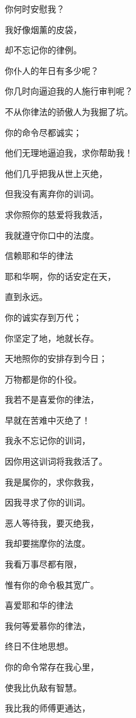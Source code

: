 {\par }{\Q 你何时安慰我？
\par }{\Q {}我好像烟薰的皮袋，
\par }{\Q 却不忘记你的律例。
\par }{\Q {}你仆人的年日有多少呢？
\par }{\Q 你几时向逼迫我的人施行审判呢？
\par }{\Q {}不从你律法的骄傲人为我掘了坑。
\par }{\Q {}你的命令尽都诚实；
\par }{\Q 他们无理地逼迫我，求你帮助我！
\par }{\Q {}他们几乎把我从世上灭绝，
\par }{\Q 但我没有离弃你的训词。
\par }{\Q {}求你照你的慈爱将我救活，
\par }{\Q 我就遵守你口中的法度。
\par }{\SH 信赖耶和华的律法
\par }{\Q {}耶和华啊，你的话安定在天，
\par }{\Q 直到永远。
\par }{\Q {}你的诚实存到万代；
\par }{\Q 你坚定了地，地就长存。
\par }{\Q {}天地照你的安排存到今日；
\par }{\Q 万物都是你的仆役。
\par }{\Q {}我若不是喜爱你的律法，
\par }{\Q 早就在苦难中灭绝了！
\par }{\Q {}我永不忘记你的训词，
\par }{\Q 因你用这训词将我救活了。
\par }{\Q {}我是属你的，求你救我，
\par }{\Q 因我寻求了你的训词。
\par }{\Q {}恶人等待我，要灭绝我，
\par }{\Q 我却要揣摩你的法度。
\par }{\Q {}我看万事尽都有限，
\par }{\Q 惟有你的命令极其宽广。
\par }{\SH 喜爱耶和华的律法
\par }{\Q {}我何等爱慕你的律法，
\par }{\Q 终日不住地思想。
\par }{\Q {}你的命令常存在我心里，
\par }{\Q 使我比仇敌有智慧。
\par }{\Q {}我比我的师傅更通达，
}
